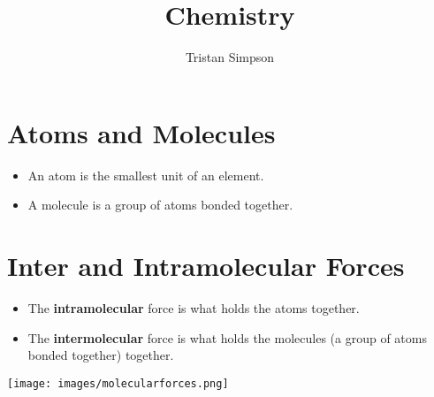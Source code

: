\documentclass{article}
\title{Chemistry}
\author{Tristan Simpson}
\begin{document}
\maketitle
\tableofcontents

\section{Atoms and Molecules}
\begin{itemize}
    \item An atom is the smallest unit of an element.
    \item A molecule is a group of atoms bonded together.
\end{itemize}

\section{Inter and Intramolecular Forces}
\begin{itemize}
    \item The \textbf{intramolecular} force is what holds the atoms together.
    \item The \textbf{intermolecular} force is what holds the molecules (a group of atoms bonded together) together.
\end{itemize}
\texttt{[image: images/molecularforces.png]}
\end{document}
